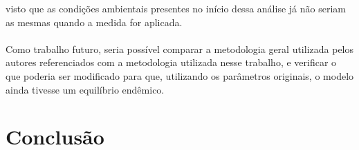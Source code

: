 \documentclass[12pt]{article}
\begin{document}
visto que as condições ambientais presentes no início dessa análise
já não seriam as mesmas quando a medida for aplicada.
\\\\
Como trabalho futuro, seria possível comparar a metodologia geral utilizada pelos autores 
referenciados com a metodologia utilizada nesse trabalho, e verificar 
o que poderia ser modificado para que, utilizando os parâmetros originais, o modelo
ainda tivesse um equilíbrio endêmico.

\newpage
\section{Conclusão}



\newpage
\end{document}
